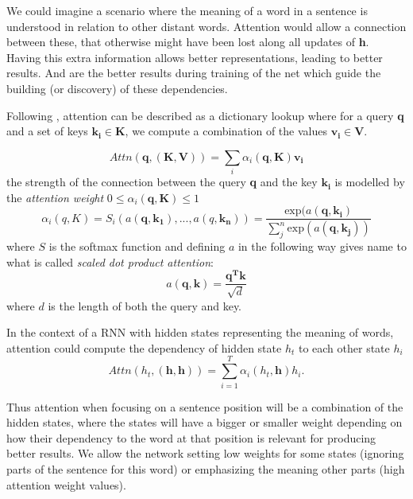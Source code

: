 \documentclass[11pt,english,listoffigures,listoftables]{tfgetsinf}
\newcommand{\vect}[1]{\mathbf{#1}}
\begin{document}
We could imagine a scenario where the meaning of a word in a sentence is understood in relation to other distant words. Attention would allow a connection between these, that otherwise might have been lost along all updates of \textbf{h}. Having this extra information allows better representations, leading to better results. And are the better results during training of the net which guide the building (or discovery) of these dependencies.

Following \cite{pml1Book}, attention can be described as a dictionary lookup where for a query \textbf{q} and a set of keys $\vect{k_i} \in \vect{K}$, we compute a combination of the values $\vect{v_i} \in \vect{V}$.

\begin{equation}\label{attn1}
    Attn(\vect{q}, (\vect{K}, \vect{V})) = \sum_i \alpha_i(\vect{q}, \vect{K})\vect{v_i}
\end{equation}
the strength of the connection between the query \textbf{q}  and the key $\vect{k_i}$ is modelled by the \textit{attention weight} $0\leq \alpha_i(\vect{q},\vect{K})\leq1$
\begin{equation}\label{attn2}
    \alpha_i(q,K) = S_i(a(\vect{q},\vect{k_1}), ...,a(q, \vect{k_n})) = \frac{\text{exp}(a(\vect{q},\vect{k_i})}{
    \sum_j^n \text{exp}(a(\vect{q},\vect{k_j}))}
\end{equation}
where $S$ is the softmax function and defining $a$ in the following way gives name to what is called \textit{scaled dot product attention}:
\begin{equation}\label{sdpa}
    a(\vect{q},\vect{k}) = \frac{\vect{q^T}\vect{k}}{\sqrt{d}} 
\end{equation}
where $d$ is the length of both the query and key.

In the context of a RNN with hidden states representing the meaning of words, attention could compute the dependency of hidden state $h_t$ to each other state $h_i$
\begin{equation}\label{attnRnn}
    Attn(h_t, (\vect{h}, \vect{h})) = \sum_{i=1}^T \alpha_i(h_t, \vect{h})h_i.
\end{equation}

Thus attention when focusing on a sentence position will be a combination of the hidden states, where the states will have a bigger or smaller weight depending on how their dependency to the word at that position is relevant for producing better results. We allow the network setting low weights for some states (ignoring parts of the sentence for this word) or emphasizing the meaning other parts (high attention weight values).
\end{document}

